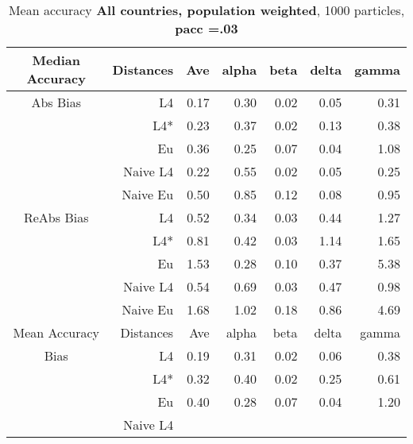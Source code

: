 \documentclass[a4paper,12pt,twoside]{book}
\begin{document}


\begin{table}[H]

\centering
\vfill
\vspace{2cm}
\caption{Mean  accuracy \textbf{All countries, population weighted}, 1000 particles, \textbf{pacc =.03}}


\begin{tabular}{crrrrrr}

  \hline
  
{\color{blue}Median Accuracy} & Distances & Ave & alpha & beta & delta & gamma \\ 
  \hline
{\color{blue}Abs Bias} & L4  &0.17 & 0.30 & 0.02 & 0.05 & 0.31 \\ 
  
&L4*  & 0.23 & 0.37 & 0.02 & 0.13 & 0.38 \\ 
  
&Eu &   0.36 & 0.25 & 0.07 & 0.04 & 1.08 \\ 
  
&Naive L4&      
  0.22 & 0.55 & 0.02 & 0.05 & 0.25 \\ 
&Naive Eu &  0.50 & 0.85 & 0.12 & 0.08 & 0.95 \\ 
 
   \hline
   
{\color{blue} ReAbs Bias } & L4  &0.52 & 0.34 & 0.03 & 0.44 & 1.27 \\ 
  
&L4*  &0.81 & 0.42 & 0.03 & 1.14 & 1.65 \\ 
 
&Eu &   
  1.53 & 0.28 & 0.10 & 0.37 & 5.38 \\ 
  
&Naive L4&  0.54 & 0.69 & 0.03 & 0.47 & 0.98 \\ 
&Naive Eu &   1.68 & 1.02 & 0.18 & 0.86 & 4.69 \\ 
  
   \hline
{\color{blue}Mean Accuracy} & Distances & Ave & alpha & beta & delta & gamma \\ 
  \hline
{\color{blue}Bias} & L4  &0.19 & 0.31 & 0.02 & 0.06 & 0.38 \\ 
  
&L4*  &0.32 & 0.40 & 0.02 & 0.25 & 0.61 \\ 
  
  
&Eu &   0.40 & 0.28 & 0.07 & 0.04 & 1.20 \\ 
 
  
&Naive L4&  
   

\end{tabular}
\end{table}
\end{document}
